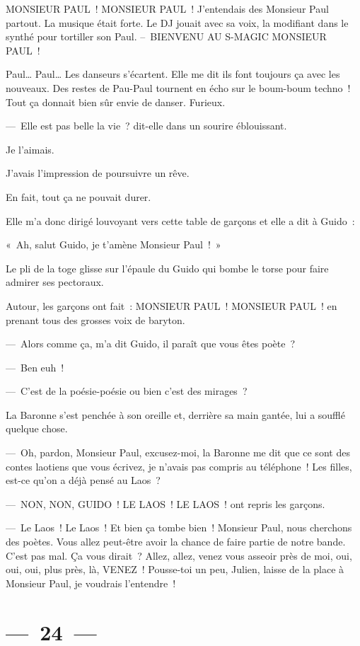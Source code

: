 \documentclass[french,twoside]{book} %
\begin{document}
\noindent MONSIEUR PAUL ! MONSIEUR PAUL ! J’entendais des Monsieur Paul partout. La musique était forte. Le DJ jouait avec sa voix, la modifiant dans le synthé pour tortiller son Paul. – BIENVENU AU S-MAGIC MONSIEUR PAUL !\par
Paul… Paul… Les danseurs s’écartent. Elle me dit ils font toujours ça avec les nouveaux. Des restes de Pau-Paul tournent en écho sur le boum-boum techno ! Tout ça donnait bien sûr envie de danser. Furieux.\par
— Elle est pas belle la vie ? dit-elle dans un sourire éblouissant.\par
Je l’aimais.\par
J’avais l’impression de poursuivre un rêve.\par
En fait, tout ça ne pouvait durer.\par
Elle m’a donc dirigé louvoyant vers cette table de garçons et elle a dit à Guido :\par
« Ah, salut Guido, je t’amène Monsieur Paul ! »\par
Le pli de la toge glisse sur l’épaule du Guido qui bombe le torse pour faire admirer ses pectoraux.\par
Autour, les garçons ont fait : MONSIEUR PAUL ! MONSIEUR PAUL ! en prenant tous des grosses voix de baryton.\par
— Alors comme ça, m’a dit Guido, il paraît que vous êtes poète ?\par
— Ben euh !\par
— C’est de la poésie-poésie ou bien c’est des mirages ?\par
La Baronne s’est penchée à son oreille et, derrière sa main gantée, lui a soufflé quelque chose.\par
— Oh, pardon, Monsieur Paul, excusez-moi, la Baronne me dit que ce sont des contes laotiens que vous écrivez, je n’avais pas compris au téléphone ! Les filles, est-ce qu’on a déjà pensé au Laos ?\par
— NON, NON, GUIDO ! LE LAOS ! LE LAOS ! ont repris les garçons.\par
— Le Laos ! Le Laos ! Et bien ça tombe bien ! Monsieur Paul, nous cherchons des poètes. Vous allez peut-être avoir la chance de faire partie de notre bande. C’est pas mal. Ça vous dirait ? Allez, allez, venez vous asseoir près de moi, oui, oui, oui, plus près, là, VENEZ ! Pousse-toi un peu, Julien, laisse de la place à Monsieur Paul, je voudrais l’entendre !

\section[{— 24 —}]{— 24 —}
\renewcommand{\leftmark}{— 24 —}
\end{document}
